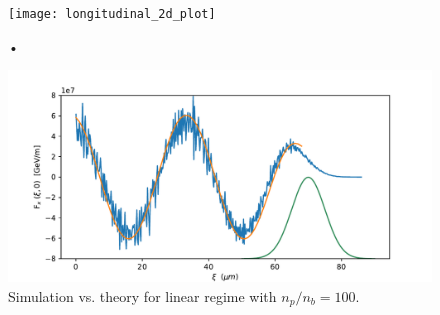 \begin{figure}
\centering
\texttt{[image: longitudinal\_2d\_plot]}
\label{transverse_plot}
\caption{•}
\end{figure}
\begin{figure}
\includegraphics[width=\textwidth]{test2.pdf}
\caption{Simulation vs. theory for linear regime with $n_p/n_b=100$. }
\label{theory_vs_simulation}
\end{figure}
